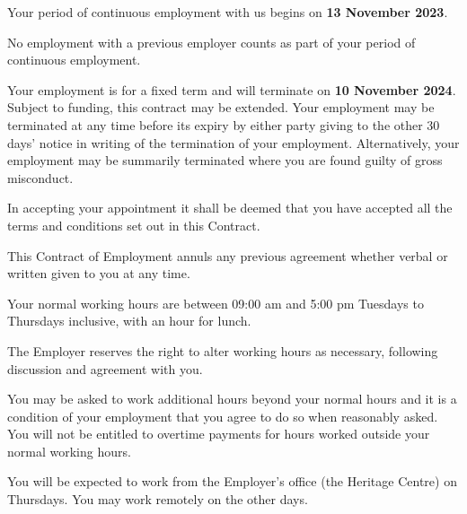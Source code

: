 \documentclass[a4paper,11pt,onecolumn ]{article}
\begin{document}
\begin{legal}
\item {}
\begin{legal}
  \item Your period of continuous employment with us begins on \textbf{13 November 2023}.
  \item No employment with a previous employer counts as part of your period of
  continuous employment.
  \item Your employment is for a fixed term and will terminate on \textbf{10 November 2024}.
  Subject to funding, this contract may be extended. Your employment may be
  terminated at any time before its expiry by either party giving to the other 30
  days’ notice in writing of the termination of your employment. Alternatively,
  your employment may be summarily terminated where you are found guilty of
  gross misconduct.
  \item In accepting your appointment it shall be deemed that you have accepted all the
  terms and conditions set out in this Contract.
  \item This Contract of Employment annuls any previous agreement whether verbal or
  written given to you at any time.
\end{legal}


\item {}
\begin{legal}
\item Your normal working hours are between 09:00 am and 5:00 pm Tuesdays to
Thursdays inclusive, with an hour for lunch.
\item The Employer reserves the right to alter working hours as necessary, following
discussion and agreement with you.
\item You may be asked to work additional hours beyond your normal hours and it is
a condition of your employment that you agree to do so when reasonably asked.
You will not be entitled to overtime payments for hours worked outside your
normal working hours.
\end{legal}


\item {}
You will be expected to work from the Employer's office (the Heritage Centre) on 
Thursdays. You may work remotely on the other days.


\end{legal}
\end{document}
